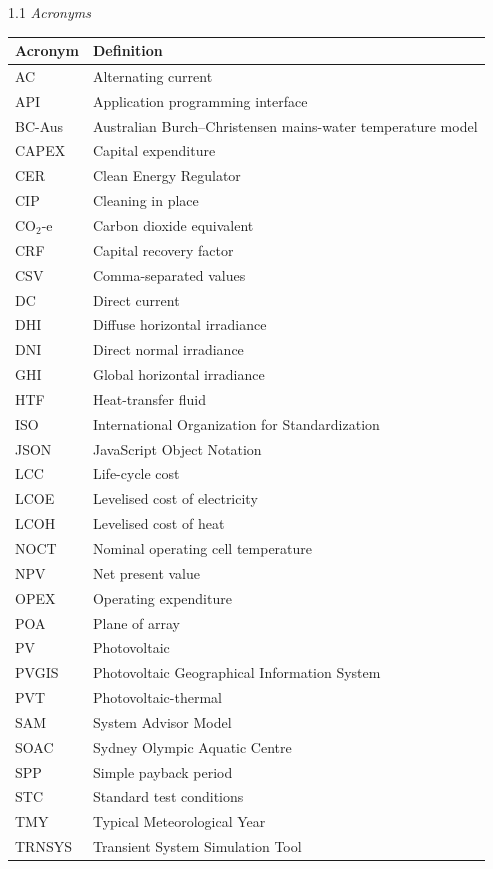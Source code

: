 \documentclass[12pt,letterpaper]{article}
\newcommand{\referenceheading}[1]{\vspace{1.55em}\textit{#1}\par\vspace{0.45em}}
\begin{document}
\begin{spacing}{1.1}
\referenceheading{Acronyms}
\begin{longtable}{@{}p{2.6cm} p{11.3cm}@{}}
\toprule
\textbf{Acronym} & \textbf{Definition} \\
\midrule
\endhead
AC & Alternating current \\
API & Application programming interface \\
BC-Aus & Australian Burch--Christensen mains-water temperature model \\
CAPEX & Capital expenditure \\
CER & Clean Energy Regulator \\
CIP & Cleaning in place \\
CO$_2$-e & Carbon dioxide equivalent \\
CRF & Capital recovery factor \\
CSV & Comma-separated values \\
DC & Direct current \\
DHI & Diffuse horizontal irradiance \\
DNI & Direct normal irradiance \\
GHI & Global horizontal irradiance \\
HTF & Heat-transfer fluid \\
ISO & International Organization for Standardization \\
JSON & JavaScript Object Notation \\
LCC & Life-cycle cost \\
LCOE & Levelised cost of electricity \\
LCOH & Levelised cost of heat \\
NOCT & Nominal operating cell temperature \\
NPV & Net present value \\
OPEX & Operating expenditure \\
POA & Plane of array \\
PV & Photovoltaic \\
PVGIS & Photovoltaic Geographical Information System \\
PVT & Photovoltaic-thermal \\
SAM & System Advisor Model \\
SOAC & Sydney Olympic Aquatic Centre \\
SPP & Simple payback period \\
STC & Standard test conditions \\
TMY & Typical Meteorological Year \\
TRNSYS & Transient System Simulation Tool \\
\bottomrule
\end{longtable}

\end{spacing}
\end{document}
